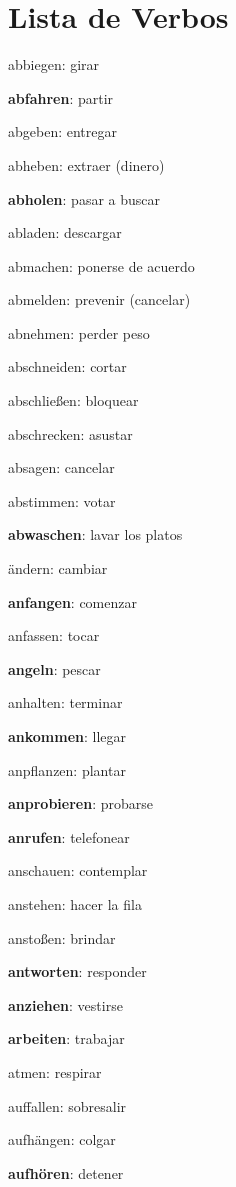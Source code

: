 \section{Lista de Verbos}
\begin{multicols}{2}
\begin{myitemize}
\item abbiegen: girar
\item \textbf{abfahren}: partir
\item abgeben: entregar
\item abheben: extraer (dinero)
\item \textbf{abholen}: pasar a buscar
\item abladen: descargar
\item abmachen: ponerse de acuerdo
\item abmelden: prevenir (cancelar)
\item abnehmen: perder peso
\item abschneiden: cortar
\item abschließen: bloquear
\item abschrecken: asustar
\item absagen: cancelar
\item abstimmen: votar
\item \textbf{abwaschen}: lavar los platos
\item ändern: cambiar
\item \textbf{anfangen}: comenzar
\item anfassen: tocar
\item \textbf{angeln}: pescar
\item anhalten: terminar
\item \textbf{ankommen}: llegar
\item anpflanzen: plantar
\item \textbf{anprobieren}: probarse
\item \textbf{anrufen}: telefonear
\item anschauen: contemplar
\item anstehen: hacer la fila
\item anstoßen: brindar
\item \textbf{antworten}: responder
\item \textbf{anziehen}: vestirse
\item \textbf{arbeiten}: trabajar
\item atmen: respirar
\item auffallen: sobresalir
\item aufhängen: colgar
\item \textbf{aufhören}: detener

\end{myitemize}
\end{multicols}
